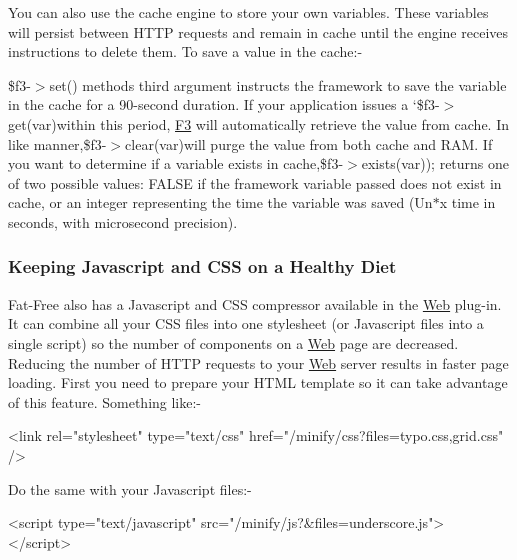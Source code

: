 You can also use the cache engine to store your own variables. These variables will persist between H\+T\+TP requests and remain in cache until the engine receives instructions to delete them. To save a value in the cache\+:-\/




{\ttfamily \$f3-\/$>$set()} method\textquotesingle{}s third argument instructs the framework to save the variable in the cache for a 90-\/second duration. If your application issues a `\$f3-\/$>$get(\textquotesingle{}var\textquotesingle{}){\ttfamily within this period, \hyperlink{class_f3}{F3} will automatically retrieve the value from cache. In like manner,}\$f3-\/$>$clear(\textquotesingle{}var\textquotesingle{}){\ttfamily will purge the value from both cache and R\+AM. If you want to determine if a variable exists in cache,}\$f3-\/$>$exists(\textquotesingle{}var\textquotesingle{})); returns one of two possible values\+: F\+A\+L\+SE if the framework variable passed does not exist in cache, or an integer representing the time the variable was saved (Un$\ast$x time in seconds, with microsecond precision).

\subsubsection*{Keeping Javascript and C\+SS on a Healthy Diet}

Fat-\/\+Free also has a Javascript and C\+SS compressor available in the \hyperlink{class_web}{Web} plug-\/in. It can combine all your C\+SS files into one stylesheet (or Javascript files into a single script) so the number of components on a \hyperlink{class_web}{Web} page are decreased. Reducing the number of H\+T\+TP requests to your \hyperlink{class_web}{Web} server results in faster page loading. First you need to prepare your H\+T\+ML template so it can take advantage of this feature. Something like\+:-\/


\begin{DoxyCode}
<link rel="stylesheet" type="text/css"
    href="/minify/css?files=typo.css,grid.css" />
\end{DoxyCode}


Do the same with your Javascript files\+:-\/


\begin{DoxyCode}
<script type="text/javascript" src="/minify/js?&files=underscore.js">
</script>
\end{DoxyCode}


